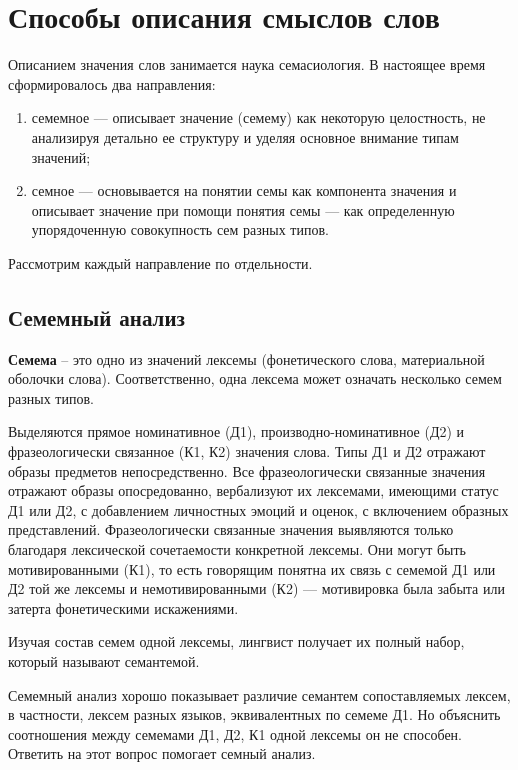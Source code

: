 \section{Способы описания смыслов слов}

Описанием значения слов занимается наука семасиология.
В настоящее время сформировалось два направления:
\begin{enumerate}[label=\arabic*.]
	\item семемное --- описывает значение (семему) как некоторую целостность, не анализируя детально ее структуру и уделяя основное внимание типам значений;
	\item семное --- основывается на понятии семы как компонента значения и описывает значение при помощи понятия семы --- как определенную упорядоченную совокупность сем разных типов.
\end{enumerate}

Рассмотрим каждый направление по отдельности.

\subsection{Семемный анализ}

\textbf{Семема} – это одно из значений лексемы (фонетического слова, материальной оболочки слова).
Соответственно, одна лексема может означать несколько семем разных типов. 

Выделяются прямое номинативное (Д1), производно-номинативное (Д2) и фразеологически связанное (К1, К2) значения слова.
Типы Д1 и Д2 отражают образы предметов непосредственно.
Все фразеологически связанные значения отражают образы опосредованно, вербализуют их лексемами, имеющими статус Д1 или Д2, с добавлением личностных эмоций и оценок, с включением образных представлений. 
Фразеологически связанные значения выявляются только благодаря лексической сочетаемости конкретной лексемы. Они могут быть мотивированными (К1), то есть говорящим понятна их связь с семемой Д1 или Д2 той же лексемы и немотивированными (К2) --- мотивировка была забыта или затерта фонетическими искажениями.

Изучая состав семем одной лексемы, лингвист получает их полный набор, который называют семантемой.

Семемный анализ хорошо показывает различие семантем сопоставляемых лексем, в частности, лексем разных языков, эквивалентных по семеме Д1. 
Но объяснить соотношения между семемами Д1, Д2, К1 одной лексемы он не способен. 
Ответить на этот вопрос помогает семный анализ.

